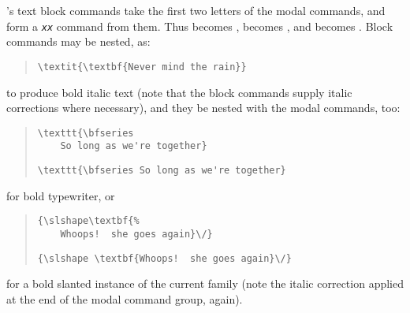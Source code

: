 \LaTeXe{}'s text block commands take the first two letters of the
modal commands, and form a \emph{\texttt{xx}} command from
them.  Thus  becomes ,
 becomes , and 
becomes .  Block commands may be nested, as:
\begin{quote}
\begin{verbatim}
\textit{\textbf{Never mind the rain}}
\end{verbatim}
\end{quote}
to produce bold italic text (note that the block commands supply
italic corrections where necessary), and they be nested with the
\LaTeXe{} modal commands, too:
\begin{quote}
\begin{narrowversion}
\begin{verbatim}
\texttt{\bfseries
    So long as we're together}
\end{verbatim}
\end{narrowversion}
\begin{wideversion}
\begin{verbatim}
\texttt{\bfseries So long as we're together}
\end{verbatim}
\end{wideversion}
\end{quote}
for bold typewriter, or
\begin{quote}
\begin{narrowversion}
\begin{verbatim}
{\slshape\textbf{%
    Whoops!  she goes again}\/}
\end{verbatim}
\end{narrowversion}
\begin{wideversion}
\begin{verbatim}
{\slshape \textbf{Whoops!  she goes again}\/}
\end{verbatim}
\end{wideversion}
\end{quote}
for a bold slanted instance of the current family (note the italic
correction applied at the end of the modal command group, again).

